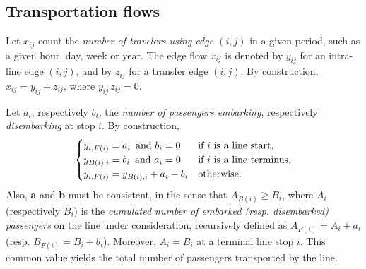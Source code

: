 \documentclass{bmcart}
\begin{document}
\vspace*{0.1cm}

\subsection{Transportation flows}
\label{Transportation flows}
Let  $x_{ij}$ count the \emph{number of travelers using edge $(i,j)$} in a given period, such as a given hour, day, week or  year.  The edge flow $x_{ij}$ is denoted by $y_{ij}$ for an intra-line edge $(i,j)$, and 
by $z_{ij}$ for a transfer edge $(i,j)$. By construction, $x_{ij}=y_{ij}+z_{ij}$, where $y_{ij}\,  z_{ij}=0$. 

\vspace*{0.1cm}


Let $a_i$, respectively $b_i$, the \emph{number of passengers embarking}, respectively \emph{disembarking} at stop $i$. By construction, 
\begin{equation}
\label{bilan1ligne}
\begin{cases}
 y_{i,F(i)}=a_i \text{\,  and } b_i=0   & \text{if $i$ is a line start}, \\
y_{B(i),i}=b_i \text{\,  and } a_i=0   & \text{if $i$ is a line terminus}, \\
 y_{i,F(i)}=y_{B(i),i}+a_i-b_i     & \text{otherwise}.
\end{cases}
\end{equation}
Also, $\mathbf{a}$ and $\mathbf{b}$ must be consistent, in the sense that $A_{B(i)}\ge B_i$, where $A_i$ (respectively $B_i$) is the \emph{cumulated number of embarked 
(resp. disembarked) passengers} on the line under consideration, recursively defined as $A_{F(i)}=A_i+a_i$ (resp. $B_{F(i)}=B_i+b_i$). Moreover,  $A_i=B_i$ at a terminal line stop $i$. This common value yields  the total number of passengers transported by the line. 



\vspace*{0.1cm}
\end{document}
